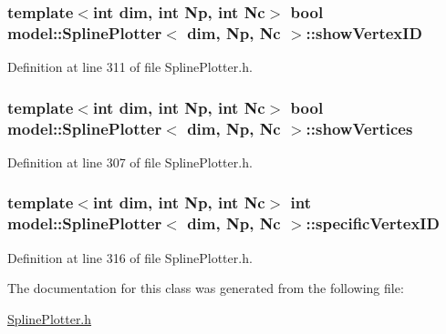 \hypertarget{classmodel_1_1_spline_plotter_a8d9c7b535dd59ae45dc245475a8d2cab}{}
\subsubsection[{show\+Vertex\+I\+D}]{\setlength{\rightskip}{0pt plus 5cm}template$<$int dim, int Np, int Nc$>$ bool {\bf model\+::\+Spline\+Plotter}$<$ {\bf dim}, Np, {\bf Nc} $>$\+::show\+Vertex\+I\+D}\label{classmodel_1_1_spline_plotter_a8d9c7b535dd59ae45dc245475a8d2cab}


Definition at line 311 of file Spline\+Plotter.\+h.

\hypertarget{classmodel_1_1_spline_plotter_a1f44c143939ff209d75a0b5c8d977887}{}
\subsubsection[{show\+Vertices}]{\setlength{\rightskip}{0pt plus 5cm}template$<$int dim, int Np, int Nc$>$ bool {\bf model\+::\+Spline\+Plotter}$<$ {\bf dim}, Np, {\bf Nc} $>$\+::show\+Vertices}\label{classmodel_1_1_spline_plotter_a1f44c143939ff209d75a0b5c8d977887}


Definition at line 307 of file Spline\+Plotter.\+h.

\hypertarget{classmodel_1_1_spline_plotter_aa8b770cfb4242e3b8b3660c90306e535}{}
\subsubsection[{specific\+Vertex\+I\+D}]{\setlength{\rightskip}{0pt plus 5cm}template$<$int dim, int Np, int Nc$>$ int {\bf model\+::\+Spline\+Plotter}$<$ {\bf dim}, Np, {\bf Nc} $>$\+::specific\+Vertex\+I\+D}\label{classmodel_1_1_spline_plotter_aa8b770cfb4242e3b8b3660c90306e535}


Definition at line 316 of file Spline\+Plotter.\+h.



The documentation for this class was generated from the following file\+:\begin{DoxyCompactItemize}
\item 
\hyperlink{_spline_plotter_8h}{Spline\+Plotter.\+h}\end{DoxyCompactItemize}
